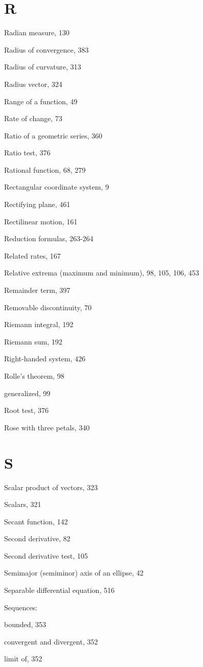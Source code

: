 \documentclass[10pt]{article}
\begin{document}
\section*{R}
Radian measure, 130

Radius of convergence, 383

Radius of curvature, 313

Radius vector, 324

Range of a function, 49

Rate of change, 73

Ratio of a geometric series, 360

Ratio test, 376

Rational function, 68, 279

Rectangular coordinate system, 9

Rectifying plane, 461

Rectilinear motion, 161

Reduction formulas, 263-264

Related rates, 167

Relative extrema (maximum and minimum), 98, 105, 106, 453

Remainder term, 397

Removable discontinuity, 70

Riemann integral, 192

Riemann sum, 192

Right-handed system, 426

Rolle's theorem, 98

generalized, 99

Root test, 376

Rose with three petals, 340

\section*{S}
Scalar product of vectors, 323

Scalars, 321

Secant function, 142

Second derivative, 82

Second derivative test, 105

Semimajor (semiminor) axis of an ellipse, 42

Separable differential equation, 516

Sequences:

bounded, 353

convergent and divergent, 352

limit of, 352
\end{document}
